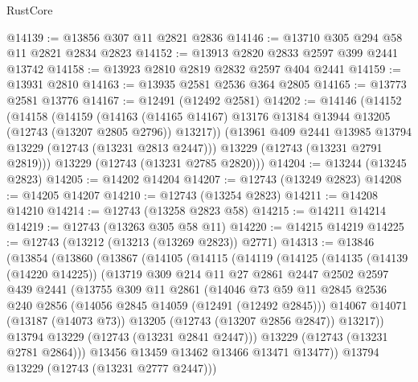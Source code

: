 \begin{lexlean}{RustCore}
\begin{coremodule}
@14139 := @13856 @307 @11 @2821 @2836
@14146 := @13710 @305 @294 @58 @11 @2821 @2834 @2823
@14152 := @13913 @2820 @2833 @2597 @399 @2441 @13742
@14158 := @13923 @2810 @2819 @2832 @2597 @404 @2441
@14159 := @13931 @2810
@14163 := @13935 @2581 @2536 @364 @2805
@14165 := @13773 @2581 @13776
@14167 := @12491 (@12492 @2581)
@14202 := @14146
    (@14152
      (@14158
        (@14159
          (@14163 (@14165 @14167) @13176 @13184 @13944 @13205 (@12743 (@13207 @2805 @2796)) @13217))
        (@13961 @409 @2441 @13985 @13794 @13229 (@12743 (@13231 @2813 @2447)))
        @13229
        (@12743 (@13231 @2791 @2819)))
      @13229
      (@12743 (@13231 @2785 @2820)))
@14204 := @13244 (@13245 @2823)
@14205 := @14202 @14204
@14207 := @12743 (@13249 @2823)
@14208 := @14205 @14207
@14210 := @12743 (@13254 @2823)
@14211 := @14208 @14210
@14214 := @12743 (@13258 @2823 @58)
@14215 := @14211 @14214
@14219 := @12743 (@13263 @305 @58 @11)
@14220 := @14215 @14219
@14225 := @12743 (@13212 (@13213 (@13269 @2823)) @2771)
@14313 := @13846
    (@13854
      (@13860
        (@13867
          (@14105
            (@14115
              (@14119
                (@14125
                  (@14135
                    (@14139 (@14220 @14225))
                    (@13719
                      @309
                      @214
                      @11
                      @27
                      @2861
                      @2447
                      @2502
                      @2597
                      @439
                      @2441
                      (@13755
                        @309
                        @11
                        @2861
                        (@14046
                          @73
                          @59
                          @11
                          @2845
                          @2536
                          @240
                          @2856
                          (@14056 @2845 @14059 (@12491 (@12492 @2845)))
                          @14067
                          @14071
                          (@13187 (@14073 @73))
                          @13205
                          (@12743 (@13207 @2856 @2847))
                          @13217))
                      @13794
                      @13229
                      (@12743 (@13231 @2841 @2447)))
                    @13229
                    (@12743 (@13231 @2781 @2864)))
                  @13456
                  @13459
                  @13462
                  @13466
                  @13471
                  @13477))
              @13794
              @13229
              (@12743 (@13231 @2777 @2447)))

\end{coremodule}
\end{lexlean}
